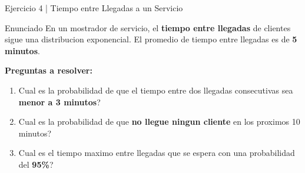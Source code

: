 \documentclass[10pt]{beamer}
\begin{document}
\begin{frame}{Ejercicio 4 | Tiempo entre Llegadas a un Servicio}
\begin{block}{Enunciado}
\justifying
En un mostrador de servicio, el \textbf{tiempo entre llegadas} de clientes sigue una distribucion exponencial. El promedio de tiempo entre llegadas es de \textbf{5 minutos}.
\end{block}

\vspace{0.2cm}
\textbf{Preguntas a resolver:}
\begin{enumerate}
    \item Cual es la probabilidad de que el tiempo entre dos llegadas consecutivas sea \textbf{menor a 3 minutos}?
    \item Cual es la probabilidad de que \textbf{no llegue ningun cliente} en los proximos 10 minutos?
    \item Cual es el tiempo maximo entre llegadas que se espera con una probabilidad del \textbf{95\%}?
\end{enumerate}

\vspace{0.2cm}
\begin{center}
\end{center}
\end{frame}
\end{document}
